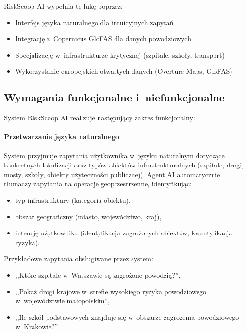 RiskScoop AI wypełnia tę lukę poprzez:
\begin{itemize}
    \item Interfejs języka naturalnego dla intuicyjnych zapytań
    \item Integrację z~Copernicus GloFAS dla danych powodziowych
    \item Specjalizację w~infrastrukturze krytycznej (szpitale, szkoły, transport)
    \item Wykorzystanie europejskich otwartych danych (Overture Maps, GloFAS)
\end{itemize}

\subsection{Wymagania funkcjonalne i~niefunkcjonalne}

System RiskScoop AI realizuje następujący zakres funkcjonalny:

\paragraph{Przetwarzanie języka naturalnego}
System przyjmuje zapytania użytkownika w~języku naturalnym dotyczące konkretnych lokalizacji oraz typów obiektów infrastrukturalnych (szpitale, drogi, mosty, szkoły, obiekty użyteczności publicznej). Agent AI automatycznie tłumaczy zapytania na operacje geoprzestrzenne, identyfikując:
\begin{itemize}
    \item typ infrastruktury (kategoria obiektu),
    \item obszar geograficzny (miasto, województwo, kraj),
    \item intencję użytkownika (identyfikacja zagrożonych obiektów, kwantyfikacja ryzyka).
\end{itemize}

Przykładowe zapytania obsługiwane przez system:
\begin{itemize}
    \item ,,Które szpitale w~Warszawie są zagrożone powodzią?'',
    \item ,,Pokaż drogi krajowe w~strefie wysokiego ryzyka powodziowego w~województwie małopolskim'',
    \item ,,Ile szkół podstawowych znajduje się w~obszarze zagrożenia powodziowego w~Krakowie?''.
\end{itemize}

